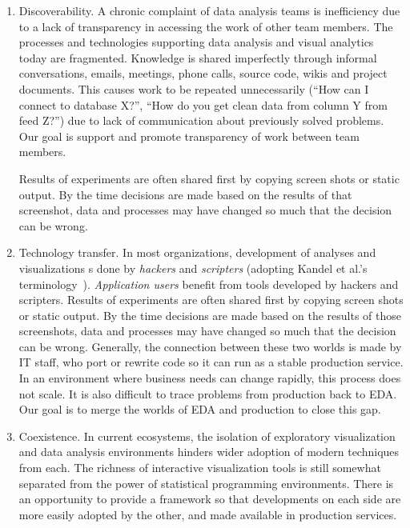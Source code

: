 \begin{enumerate}
\item Discoverability. A chronic complaint of data analysis teams is
inefficiency due to a lack of transparency in accessing the work of
other team members. The processes and technologies supporting
data analysis and visual analytics today are fragmented.
Knowledge is shared imperfectly through informal conversations, emails,
meetings, phone calls, source code, wikis and project documents.
This causes work to be repeated unnecessarily
(``How can I connect to database X?'', ``How do you get clean data
from column Y from feed Z?'') due to lack of communication about
previously solved problems. 
Our goal is support and
promote transparency of work between team members.

Results of experiments are often shared first by copying screen
shots or static output. By the time decisions are made based on
the results of that screenshot, data and processes may have changed
so much that the decision can be wrong.

\item Technology transfer.
In most organizations, development of analyses and visualizations 
s done by \emph{hackers} and \emph{scripters} (adopting Kandel et al.'s
terminology~\cite{Kandel:2012:EDA}). \emph{Application users} 
benefit from tools developed by hackers and scripters.
Results of experiments are often shared first by copying screen
shots or static output. By the time decisions are made based on
the results of those screenshots, data and processes may have changed
so much that the decision can be wrong.
Generally, the connection between these two worlds is made by IT staff,
who port or rewrite code so it can run as a stable production service.
In an environment where business needs can change rapidly, this
process does not scale. It is also difficult to trace problems
from production back to EDA.
Our goal is to merge the worlds of EDA and production to close this gap.

\item Coexistence. In current ecosystems, the isolation of exploratory
visualization and data analysis environments hinders wider adoption of
modern techniques from each.
The richness of interactive visualization tools is still somewhat
separated from the power of statistical programming environments.
There is an opportunity to provide a framework so that developments
on each side are more easily adopted by the other, and made available
in production services.

\end{enumerate}

